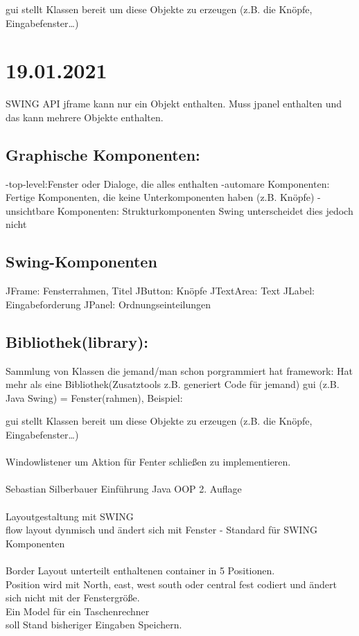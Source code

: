 \documentclass{article}
\begin{document}
	gui stellt Klassen bereit um diese Objekte zu erzeugen (z.B. die Knöpfe, Eingabefenster…) \\
	
	\section*{19.01.2021}
	SWING API jframe kann nur ein Objekt enthalten. Muss jpanel enthalten und das kann mehrere Objekte enthalten. \\
	
	\subsection*{Graphische Komponenten:}
	-top-level:Fenster oder Dialoge, die alles enthalten
	-automare Komponenten: Fertige Komponenten, die keine Unterkomponenten haben (z.B. Knöpfe)
	-unsichtbare Komponenten: Strukturkomponenten
	Swing unterscheidet dies jedoch nicht
	
	\subsection*{Swing-Komponenten}
	JFrame: Fensterrahmen, Titel
	JButton: Knöpfe
	JTextArea: Text
	JLabel: Eingabeforderung 
	JPanel: Ordnungseinteilungen
	
	\subsection*{Bibliothek(library): }
	Sammlung von Klassen die jemand/man schon porgrammiert hat
	framework: Hat mehr als eine Bibliothek(Zusatztools z.B. generiert Code für jemand)
	gui (z.B. Java Swing) = Fenster(rahmen), Beispiel:
	
	gui stellt Klassen bereit um diese Objekte zu erzeugen (z.B. die Knöpfe, Eingabefenster…)
	\\ \\
	Windowlistener um Aktion für Fenter schließen zu implementieren. \\
	\\
	Sebastian Silberbauer Einführung Java OOP 2. Auflage \\
	\\
	Layoutgestaltung mit SWING \\
	flow layout dynmisch und ändert sich mit Fenster - Standard für SWING Komponenten \\
	\\
	Border Layout unterteilt enthaltenen container in 5 Positionen. \\
	Position wird mit North, east, west south oder central fest codiert und ändert sich nicht mit der Fenstergröße. \\
	Ein Model für ein Taschenrechner \\
	soll Stand bisheriger Eingaben Speichern. \\
\end{document}
